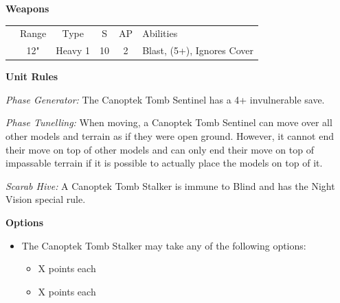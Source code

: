\begin{minipage}[t]{0.72\textwidth}
	\vspace*{2em}
	\textbf{Weapons}
	
	\begin{tabular}{m{95 pt} *{4}{c} >{\raggedright\arraybackslash}p{130pt}}
		& Range & Type & S & AP & Abilities \\
		\quickref{Exile Cannon} & 12" & Heavy 1 & 10 & 2 & Blast, \quickref{Exile Ray} (5+), Ignores Cover \\
	\end{tabular}
	
	\vspace*{2em}
	\textbf{Unit Rules}
	
	\textit{Phase Generator:} The Canoptek Tomb Sentinel has a 4+ invulnerable save.
	
	\textit{Phase Tunelling:} When moving, a Canoptek Tomb Sentinel can move over all other models and terrain as if they were open ground. However, it cannot end their move on top of other models and can only end their move on top of impassable terrain if it is possible to actually place the models on top of it.
	
	\textit{Scarab Hive:} A Canoptek Tomb Stalker is immune to Blind and has the Night Vision special rule.	
	
	\vspace*{2em}
	\textbf{Options}
	\begin{itemize}
		\item The Canoptek Tomb Stalker may take any of the following options:
		\begin{itemize}
			\item {} \dotfill X points each
			\item {} \dotfill X points each
		\end{itemize}
	\end{itemize}
\end{minipage}
\hspace{0.5em}


\newpage
\subsubsection[Canoptek Tomb Stalker]{}

